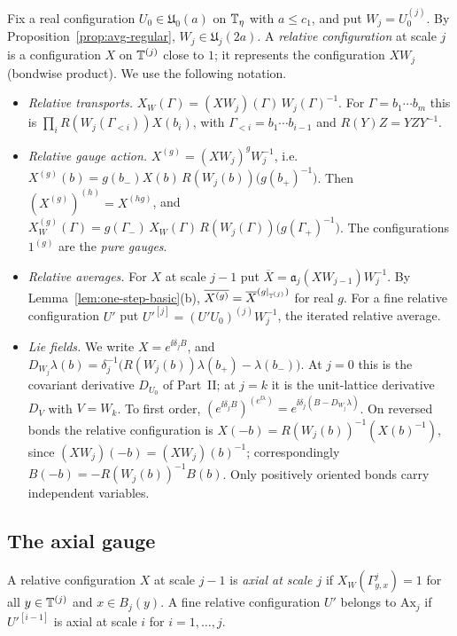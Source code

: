 Fix a real configuration $U_0\in\mathfrak U_0(a)$ on $\mathbb T_\eta$ with $a\le c_1$, and put $W_j=U_0^{(j)}$. By Proposition~\ref{prop:avg-regular}, $W_j\in\mathfrak U_j(2a)$. A \emph{relative configuration} at scale $j$ is a configuration $X$ on $\mathbb T^{(j)}$ close to $1$; it represents the configuration $XW_j$ (bondwise product). We use the following notation.
\begin{itemize}
\item \emph{Relative transports.} $X_W(\Gamma)=(XW_j)(\Gamma)\,W_j(\Gamma)^{-1}$. For $\Gamma=b_1\cdots b_m$ this is $\prod_iR(W_j(\Gamma_{<i}))X(b_i)$, with $\Gamma_{<i}=b_1\cdots b_{i-1}$ and $R(Y)Z=YZY^{-1}$.
\item \emph{Relative gauge action.} $X^{(g)}=(XW_j)^gW_j^{-1}$, i.e.\ $X^{(g)}(b)=g(b_-)X(b)\,R(W_j(b))\big(g(b_+)^{-1}\big)$. Then $(X^{(g)})^{(h)}=X^{(hg)}$, and $X^{(g)}_W(\Gamma)=g(\Gamma_-)\,X_W(\Gamma)\,R(W_j(\Gamma))\big(g(\Gamma_+)^{-1}\big)$. The configurations $1^{(g)}$ are the \emph{pure gauges}.
\item \emph{Relative averages.} For $X$ at scale $j-1$ put $\overline X=\mathfrak a_j(XW_{j-1})W_j^{-1}$. By Lemma~\ref{lem:one-step-basic}(b), $\overline{X^{(g)}}=\overline X^{(g|_{\mathbb T^{(j)}})}$ for real $g$. For a fine relative configuration $U'$ put $U'^{[j]}=(U'U_0)^{(j)}W_j^{-1}$, the iterated relative average.
\item \emph{Lie fields.} We write $X=e^{\ii\delta_jB}$, and $D_{W_j}\lambda(b)=\delta_j^{-1}\big(R(W_j(b))\lambda(b_+)-\lambda(b_-)\big)$. At $j=0$ this is the covariant derivative $D_{U_0}$ of Part~II; at $j=k$ it is the unit-lattice derivative $D_V$ with $V=W_k$. To first order, $(e^{\ii\delta_jB})^{(e^{\ii\lambda})}=e^{\ii\delta_j(B-D_{W_j}\lambda)}$. On reversed bonds the relative configuration is $X(-b)=R(W_j(b))^{-1}(X(b)^{-1})$, since $(XW_j)(-b)=(XW_j)(b)^{-1}$; correspondingly $B(-b)=-R(W_j(b))^{-1}B(b)$. Only positively oriented bonds carry independent variables.
\end{itemize}

\subsection{The axial gauge}

\begin{definition}\label{def:axial}
A relative configuration $X$ at scale $j-1$ is \emph{axial at scale $j$} if $X_W(\Gamma^j_{y,x})=1$ for all $y\in\mathbb T^{(j)}$ and $x\in B_j(y)$. A fine relative configuration $U'$ belongs to $\mathrm{Ax}_j$ if $U'^{[i-1]}$ is axial at scale $i$ for $i=1,\dots,j$.
\end{definition}

